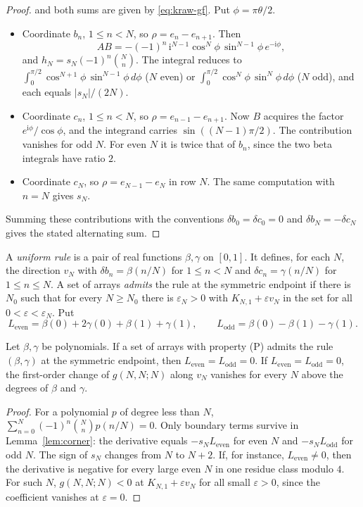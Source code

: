 \begin{proof}
and both sums are given by \eqref{eq:kraw-gf}. Put $\phi=\pi\theta/2$.
\begin{itemize}
\item Coordinate $b_n$, $1\leq n<N$, so $\rho=e_n-e_{n+1}$. Then
\[
AB=-(-1)^n\,\mathrm i^{N-1}\cos^N\!\phi\,\sin^{N-1}\!\phi\,e^{-\mathrm i\phi},
\]
and $h_N=s_N(-1)^n\binom Nn$. The integral reduces to $\int_0^{\pi/2}\cos^{N+1}\!\phi\,\sin^{N-1}\!\phi\,d\phi$ ($N$ even) or $\int_0^{\pi/2}\cos^{N}\!\phi\,\sin^{N}\!\phi\,d\phi$ ($N$ odd), and each equals $|s_N|/(2N)$.
\item Coordinate $c_n$, $1\leq n<N$, so $\rho=e_{n-1}-e_{n+1}$. Now $B$ acquires the factor $e^{\mathrm i\phi}/\cos\phi$, and the integrand carries $\sin((N-1)\pi/2)$. The contribution vanishes for odd $N$. For even $N$ it is twice that of $b_n$, since the two beta integrals have ratio $2$.
\item Coordinate $c_N$, so $\rho=e_{N-1}-e_N$ in row $N$. The same computation with $n=N$ gives $s_N$.
\end{itemize}
Summing these contributions with the conventions $\delta b_0=\delta c_0=0$ and $\delta b_N=-\delta c_N$ gives the stated alternating sum.
\end{proof}

\begin{definition}\label{def:rule}
A \emph{uniform rule} is a pair of real functions $\beta,\gamma$ on $[0,1]$. It defines, for each $N$, the direction $v_N$ with $\delta b_n=\beta(n/N)$ for $1\leq n<N$ and $\delta c_n=\gamma(n/N)$ for $1\leq n\leq N$. A set of arrays \emph{admits} the rule at the symmetric endpoint if there is $N_0$ such that for every $N\geq N_0$ there is $\varepsilon_N>0$ with $K_{N,1}+\varepsilon v_N$ in the set for all $0<\varepsilon<\varepsilon_N$. Put
\[
L_{\mathrm{even}}=\beta(0)+2\gamma(0)+\beta(1)+\gamma(1),\qquad L_{\mathrm{odd}}=\beta(0)-\beta(1)-\gamma(1).
\]
\end{definition}

\begin{theorem}\label{thm:uniform}
Let $\beta,\gamma$ be polynomials. If a set of arrays with property (P) admits the rule $(\beta,\gamma)$ at the symmetric endpoint, then $L_{\mathrm{even}}=L_{\mathrm{odd}}=0$. If $L_{\mathrm{even}}=L_{\mathrm{odd}}=0$, the first-order change of $g(N,N;N)$ along $v_N$ vanishes for every $N$ above the degrees of $\beta$ and $\gamma$.
\end{theorem}
\begin{proof}
For a polynomial $p$ of degree less than $N$, $\sum_{n=0}^N(-1)^n\binom Nnp(n/N)=0$. Only boundary terms survive in Lemma~\ref{lem:corner}: the derivative equals $-s_NL_{\mathrm{even}}$ for even $N$ and $-s_NL_{\mathrm{odd}}$ for odd $N$. The sign of $s_N$ changes from $N$ to $N+2$. If, for instance, $L_{\mathrm{even}}\neq0$, then the derivative is negative for every large even $N$ in one residue class modulo $4$. For such $N$, $g(N,N;N)<0$ at $K_{N,1}+\varepsilon v_N$ for all small $\varepsilon>0$, since the coefficient vanishes at $\varepsilon=0$.
\end{proof}

